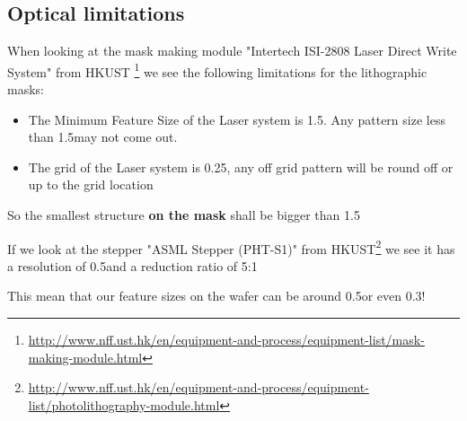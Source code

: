 \subsection{Optical limitations}
When looking at the mask making module "Intertech ISI-2808 Laser Direct Write System" from HKUST \footnote{\url{http://www.nff.ust.hk/en/equipment-and-process/equipment-list/mask-making-module.html}} we see the following limitations for the lithographic masks:
\begin{itemize}
	\item The Minimum Feature Size of the Laser system is 1.5\um. Any pattern size less than 1.5\um may not come out.
	\item The grid of the Laser system is 0.25\um, any off grid pattern will be round off or up to the grid location
\end{itemize}

So the smallest structure \textbf{on the mask} shall be bigger than 1.5\um

If we look at the stepper "ASML Stepper (PHT-S1)" from HKUST\footnote{\url{http://www.nff.ust.hk/en/equipment-and-process/equipment-list/photolithography-module.html}} we see it has a resolution of 0.5\um and a reduction ratio of 5:1

This mean that our feature sizes on the wafer can be around 0.5\um or even 0.3\um !